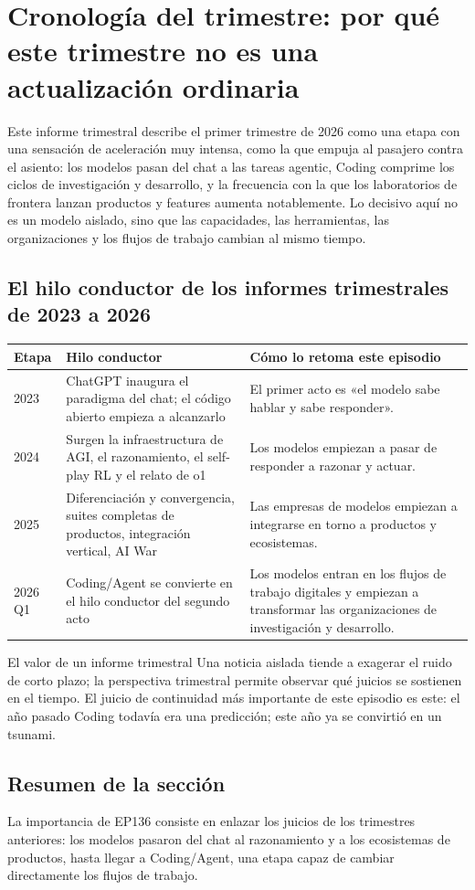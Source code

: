 \section{Cronología del trimestre: por qué este trimestre no es una actualización ordinaria}

Este informe trimestral describe el primer trimestre de 2026 como una etapa con una sensación de aceleración muy intensa, como la que empuja al pasajero contra el asiento: los modelos pasan del chat a las tareas agentic, Coding comprime los ciclos de investigación y desarrollo, y la frecuencia con la que los laboratorios de frontera lanzan productos y features aumenta notablemente. Lo decisivo aquí no es un modelo aislado, sino que las capacidades, las herramientas, las organizaciones y los flujos de trabajo cambian al mismo tiempo.

\subsection{El hilo conductor de los informes trimestrales de 2023 a 2026}

\noindent\begin{longtable}{p{}p{}p{}}
\toprule
Etapa & Hilo conductor & Cómo lo retoma este episodio \\
\midrule
2023 & ChatGPT inaugura el paradigma del chat; el código abierto empieza a alcanzarlo & El primer acto es «el modelo sabe hablar y sabe responder». \\
2024 & Surgen la infraestructura de AGI, el razonamiento, el self-play RL y el relato de o1 & Los modelos empiezan a pasar de responder a razonar y actuar. \\
2025 & Diferenciación y convergencia, suites completas de productos, integración vertical, AI War & Las empresas de modelos empiezan a integrarse en torno a productos y ecosistemas. \\
2026 Q1 & Coding/Agent se convierte en el hilo conductor del segundo acto & Los modelos entran en los flujos de trabajo digitales y empiezan a transformar las organizaciones de investigación y desarrollo. \\
\bottomrule
\end{longtable}

\begin{importantbox}{El valor de un informe trimestral}
Una noticia aislada tiende a exagerar el ruido de corto plazo; la perspectiva trimestral permite observar qué juicios se sostienen en el tiempo. El juicio de continuidad más importante de este episodio es este: el año pasado Coding todavía era una predicción; este año ya se convirtió en un tsunami.
\end{importantbox}

\subsection{Resumen de la sección}

La importancia de EP136 consiste en enlazar los juicios de los trimestres anteriores: los modelos pasaron del chat al razonamiento y a los ecosistemas de productos, hasta llegar a Coding/Agent, una etapa capaz de cambiar directamente los flujos de trabajo.
